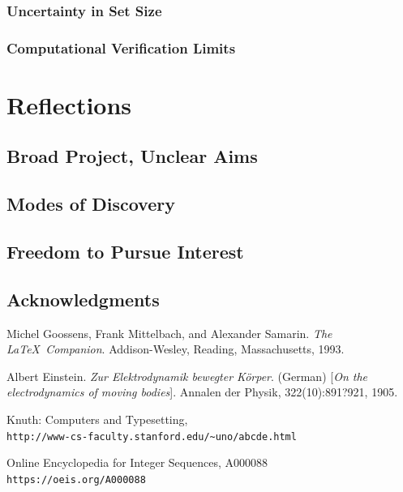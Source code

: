 \documentclass[11pt,a4paper]{report}
\begin{document}
\subsection{Uncertainty in Set Size}
\subsection{Computational Verification Limits}



\chapter{Reflections}
\section{Broad Project, Unclear Aims}
\section{Modes of Discovery}
\section{Freedom to Pursue Interest}
\section{Acknowledgments}





\begin{thebibliography}{9}
Michel Goossens, Frank Mittelbach, and Alexander Samarin. 
\textit{The \LaTeX\ Companion}. 
Addison-Wesley, Reading, Massachusetts, 1993.
 
Albert Einstein. 
\textit{Zur Elektrodynamik bewegter K{\"o}rper}. (German) 
[\textit{On the electrodynamics of moving bodies}]. 
Annalen der Physik, 322(10):891?921, 1905.
 
Knuth: Computers and Typesetting,
\\\texttt{http://www-cs-faculty.stanford.edu/\~{}uno/abcde.html}


Online Encyclopedia for Integer Sequences, A000088
\\\texttt{https://oeis.org/A000088}


\end{thebibliography}
 
 
\end{document}
